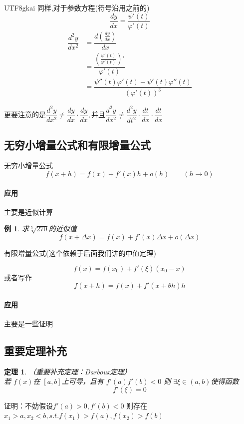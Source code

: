 \documentclass{article}
\newtheorem{theorem}{定理}[subsection]
\newtheorem{example}{例}[subsection]
\newcommand{\parameter}[1]{\left(#1\right)}
\begin{document}
\begin{CJK}{UTF8}{gkai}
同样,对于参数方程(符号沿用之前的)
\[\dfrac{dy}{dx} = \dfrac{\psi'(t)}{\varphi'(t)}\]
\[
\begin{aligned}
  \dfrac{d^2y}{dx^2} &= \dfrac{d\parameter{\frac{dy}{dx}}}{dx}\\
  &=\dfrac{\parameter{\frac{\psi'(t)}{\varphi'(t)}}'}{\varphi'(t)}\\
  &=\dfrac{\psi''(t)\varphi'(t) -\psi'(t) \varphi''(t)}{\parameter{\varphi'(t)}^3}
\end{aligned}  
 \]

更要注意的是$\dfrac{d^2 y}{dx^2} \neq \dfrac{dy}{dx} \cdot \dfrac{dy}{dx},\text{并且}\dfrac{d^2 y}{dx^2} \neq \dfrac{d^2 y}{dt^2} \cdot \dfrac{dt}{dx}\cdot \dfrac{dt}{dx}$

\subsection{无穷小增量公式和有限增量公式}
无穷小增量公式
\[f(x + h) = f(x) + f'(x) h + o(h)\quad\quad(h\to 0)\]

\paragraph{应用\\}
主要是近似计算

\begin{example}
  求$\sqrt[5]{270}$的近似值
  \[f(x + \Delta x) = f(x) + f'(x) \Delta x + o(\Delta x)\]
\end{example}
有限增量公式(这个依赖于后面我们讲的中值定理)

\[f(x) = f(x_0) + f'(\xi) (x_0 - x)\]
或者写作
\[f(x + h) = f(x) + f'(x +\theta h) h\]

\paragraph{应用\\}
主要是一些证明
\subsection{重要定理补充}
\begin{theorem}（重要补充定理：Darboux定理）\\ 
若 $f(x)$在 $[a,b]$上可导，且有 $f'(a)f'(b) < 0 $ 则 $\exists \xi \in (a,b)$使得函数
\[f'(\xi) = 0\]
\end{theorem}
证明：不妨假设$f'(a) > 0, f'(b) < 0$ 则存在 $x_1 > a , x_2 < b , s.t. f(x_1) > f(a) , f(x_2) > f(b)$


\end{CJK}
\end{document}
